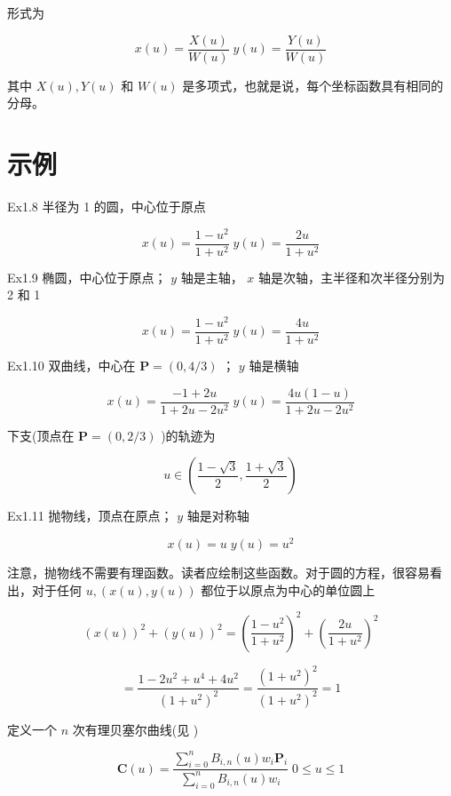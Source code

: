 \documentclass[../main.tex]{subfiles}
\begin{document}
形式为

\[
x\left( u\right)  = \frac{X\left( u\right) }{W\left( u\right) }\;y\left( u\right)  = \frac{Y\left( u\right) }{W\left( u\right) } \tag{1.13}
\]

其中 \(X\left( u\right) ,Y\left( u\right)\) 和 \(W\left( u\right)\) 是多项式，也就是说，每个坐标函数具有相同的分母。

\section*{示例}

Ex1.8 半径为 1 的圆，中心位于原点

\[
x\left( u\right)  = \frac{1 - {u}^{2}}{1 + {u}^{2}}\;y\left( u\right)  = \frac{2u}{1 + {u}^{2}}
\]

Ex1.9 椭圆，中心位于原点； \(y\) 轴是主轴， \(x\) 轴是次轴，主半径和次半径分别为 2 和 1

\[
x\left( u\right)  = \frac{1 - {u}^{2}}{1 + {u}^{2}}\;y\left( u\right)  = \frac{4u}{1 + {u}^{2}}
\]

Ex1.10 双曲线，中心在 \(\mathbf{P} = \left( {0,4/3}\right)\) ； \(y\) 轴是横轴

\[
x\left( u\right)  = \frac{-1 + {2u}}{1 + {2u} - 2{u}^{2}}\;y\left( u\right)  = \frac{{4u}\left( {1 - u}\right) }{1 + {2u} - 2{u}^{2}}
\]

下支(顶点在 \(\mathbf{P} = \left( {0,2/3}\right)\) )的轨迹为

\[
u \in  \left( {\frac{1 - \sqrt{3}}{2},\frac{1 + \sqrt{3}}{2}}\right)
\]

Ex1.11 抛物线，顶点在原点； \(y\) 轴是对称轴

\[
x\left( u\right)  = u\;y\left( u\right)  = {u}^{2}
\]

注意，抛物线不需要有理函数。读者应绘制这些函数。对于圆的方程，很容易看出，对于任何 \(u,\left( {x\left( u\right) ,y\left( u\right) }\right)\) 都位于以原点为中心的单位圆上

\[
{\left( x\left( u\right) \right) }^{2} + {\left( y\left( u\right) \right) }^{2} = {\left( \frac{1 - {u}^{2}}{1 + {u}^{2}}\right) }^{2} + {\left( \frac{2u}{1 + {u}^{2}}\right) }^{2}
\]

\[
= \frac{1 - 2{u}^{2} + {u}^{4} + 4{u}^{2}}{{\left( 1 + {u}^{2}\right) }^{2}} = \frac{{\left( 1 + {u}^{2}\right) }^{2}}{{\left( 1 + {u}^{2}\right) }^{2}} = 1
\]

定义一个 \(n\) 次有理贝塞尔曲线(见 \cite{Forr68,Pieg86,Fari83,Fari89})

\[
\mathbf{C}\left( u\right)  = \frac{\mathop{\sum }\limits_{{i = 0}}^{n}{B}_{i,n}\left( u\right) {w}_{i}{\mathbf{P}}_{i}}{\mathop{\sum }\limits_{{i = 0}}^{n}{B}_{i,n}\left( u\right) {w}_{i}}\;0 \leq  u \leq  1 \tag{1.14}
\]
\end{document}
